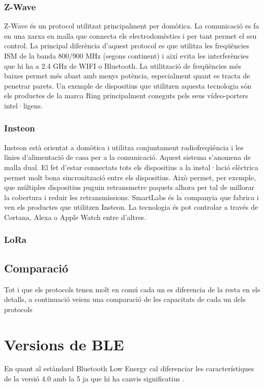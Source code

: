 \subsubsection{Z-Wave}
Z-Wave és un protocol utilitzat principalment per domòtica. La comunicació es fa en una xarxa en malla que connecta els electrodomèstics i per tant permet el seu control.
La principal diferència d'aquest protocol es que utilitza les freqüències ISM de la banda 800/900 MHz (segons continent) i així evita les interferències que hi ha a 2.4 GHz de WIFI o Bluetooth.
La utilització de freqüències més baixes permet més abast amb menys potència, especialment quant es tracta de penetrar parets.
Un exemple de dispositius que utilitzen aquesta tecnologia són els productes de la marca Ring principalment coneguts pels seus vídeo-porters intel·ligens.


\subsubsection{Insteon}
Insteon està orientat a domòtica i utilitza conjuntament radiofreqüència i les línies d'alimentació de casa per a la comunicació.
Aquest sistema s'anomena de malla dual.
El fet d'estar connectats tots els dispositius a la instal·lació elèctrica permet molt bona sincronització entre els dispositius.
Això permet, per exemple, que múltiples dispositius puguin retransmetre paquets alhora per tal de millorar la cobertura i reduir les retransmissions.
SmartLabs és la companyia que fabrica i ven els productes que utilitzen Insteon.
La tecnologia és pot controlar a través de Cortana, Alexa o Apple Watch entre d'altres.

\subsubsection{LoRa}


\subsection{Comparació}
Tot i que els protocols tenen molt en comú cada un es diferencia de la resta en els detalls, a continuació veiem una comparació de les capacitats de cada un dels protocols


\section{Versions de BLE}
En quant al estàndard Bluetooth Low Energy cal diferenciar les característiques de la versió 4.0 amb la 5 ja que hi ha canvis significatius \cite{BLE_5_improvement_over_4}.

